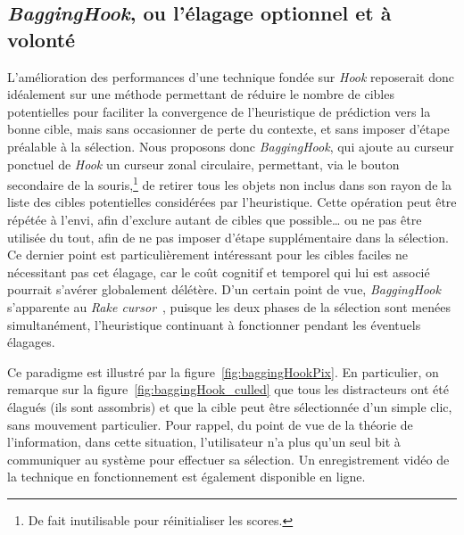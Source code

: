 	\subsection{\emph{BaggingHook}, ou l'élagage optionnel et à volonté}
	L'amélioration des performances d'une technique fondée sur \emph{Hook} reposerait donc idéalement sur une méthode permettant de réduire le nombre de cibles potentielles pour faciliter la convergence de l'heuristique de prédiction vers la bonne cible, mais sans occasionner de perte du contexte, et sans imposer d'étape préalable à la sélection. Nous proposons donc \emph{BaggingHook}, qui ajoute au curseur ponctuel de \emph{Hook} un curseur zonal circulaire, permettant, via le bouton secondaire de la souris,\footnote{De fait inutilisable pour réinitialiser les scores.} de retirer tous les objets non inclus dans son rayon de la liste des cibles potentielles considérées par l'heuristique. Cette opération peut être répétée à l'envi, afin d'exclure autant de cibles que possible\ldots{} ou ne pas être utilisée du tout, afin de ne pas imposer d'étape supplémentaire dans la sélection. Ce dernier point est particulièrement intéressant pour les cibles faciles ne nécessitant pas cet élagage, car le coût cognitif et temporel qui lui est associé pourrait s'avérer globalement délétère. D'un certain point de vue, \emph{BaggingHook} s'apparente au \emph{Rake cursor}~\cite{blanch2009rake}, puisque les deux phases de la sélection sont menées simultanément, l'heuristique continuant à fonctionner pendant les éventuels élagages.
	
	Ce paradigme est illustré par la figure~\ref{fig:baggingHookPix}. En particulier, on remarque sur la figure~\ref{fig:baggingHook_culled} que tous les distracteurs ont été élagués (ils sont assombris) et que la cible peut être sélectionnée d'un simple clic, sans mouvement particulier. Pour rappel, du point de vue de la théorie de l'information, dans cette situation, l'utilisateur n'a plus qu'un seul bit à communiquer au système pour effectuer sa sélection. Un enregistrement vidéo de la technique en fonctionnement est également disponible en ligne.\footnotemark{}
	
	
